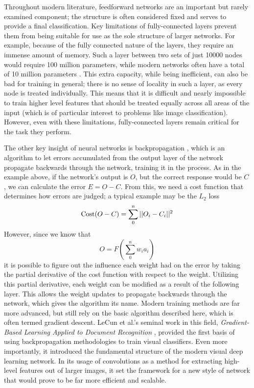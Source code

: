 Throughout modern literature, feedforward networks are an important but rarely examined component; the structure is often considered fixed and serves to provide a final classification.
Key limitations of fully-connected layers prevent them from being suitable for use as the sole structure of larger networks.
For example, because of the fully connected nature of the layers, they require an immense amount of memory.
Such a layer between two sets of just 10000 nodes would require 100 million parameters, while modern networks often have a total of 10 million parameters \cite{han2015learning}.
This extra capacity, while being inefficient, can also be bad for training in general; there is no sense of locality in such a layer, as every node is treated individually.
This means that it is difficult and nearly impossible to train higher level features that should be treated equally across all areas of the input (which is of particular interest to problems like image classification).
However, even with these limitations, fully-connected layers remain critical for the task they perform.

The other key insight of neural networks is backpropagation \cite{hecht1988theory}, which is an algorithm to let errors accumulated from the output layer of the network propagate backwards through the network, training it in the process.
As in the example above, if the network's output is $O$, but the correct response would be $C$, we can calculate the error $E = O - C$.
From this, we need a cost function that determines how errors are judged; a typical example may be the $L_2$ loss
\[\operatorname{Cost}(O - C) = \sum_0^n || O_i - C_i ||^2 \]
However, since we know that
\[O = F\left(\sum_0^n w_i a_i\right)\]
it is possible to figure out the influence each weight had on the error by taking the partial derivative of the cost function with respect to the weight.
Utilizing this partial derivative, each weight can be modified as a result of the following layer.
This allows the weight updates to propagate backwards through the network, which gives the algorithm its name.
Modern training methods are far more advanced, but still rely on the basic algorithm described here, which is often termed gradient descent.
LeCun et al.'s seminal work in this field, \emph{Gradient-Based Learning Applied to Document Recognition} \cite{lecun1998gradient}, provided the first basis of using backpropagation methodologies to train visual classifiers.
Even more importantly, it introduced the fundamental structure of the modern visual deep learning network.
In its usage of convolutions as a method for extracting high-level features out of larger images, it set the framework for a new style of network that would prove to be far more efficient and scalable.

